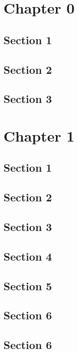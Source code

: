 \documentclass[9pt]{article}
\begin{document}
   \section{Chapter 0}
      \subsection{Section 1}
         
      \subsection{Section 2}
         
      \subsection{Section 3}
         
   \section{Chapter 1}
      \subsection{Section 1}
         
      \subsection{Section 2}
         
      \subsection{Section 3}
         
      \subsection{Section 4}
         
      \subsection{Section 5}
         
      \subsection{Section 6}
         
   \subsection{Section 6}
      
\end{document}
